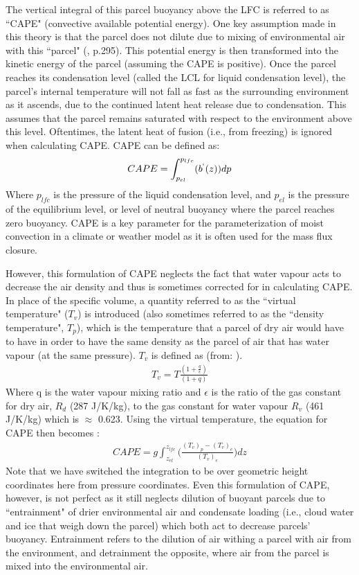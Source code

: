 \documentclass[letterpaper,12pt,titlepage,oneside,final]{book}
\begin{document}
The vertical integral of this parcel buoyancy above the LFC is referred to as ``CAPE" (convective available potential energy). One key assumption made in this theory is that the parcel does not dilute due to mixing of environmental air with this ``parcel" (\citep{holton_introduction_2004}, p.295). This potential energy is then transformed into the kinetic energy of the parcel (assuming the CAPE is positive). Once the parcel reaches its condensation level (called the LCL for liquid condensation level), the parcel's internal temperature will not fall as fast as the surrounding environment as it ascends, due to the continued latent heat release due to condensation. This assumes that the parcel remains saturated with respect to the environment above this level. Oftentimes, the latent heat of fusion (i.e., from freezing) is ignored when calculating CAPE. CAPE can be defined as: 
\begin{align}
CAPE=\int_{p_{el}}^{p_{lfc}}(b^{`}(z)){dp}
\end{align}
Where $p_{lfc}$ is the pressure of the liquid condensation level, and $p_{el}$ is the pressure of the equilibrium level, or level of neutral buoyancy where the parcel reaches zero buoyancy. CAPE is a key parameter for the parameterization of moist convection in a climate or weather model as it is often used for the mass flux closure. 

However, this formulation of CAPE neglects the fact that water vapour acts to decrease the air density and thus is sometimes corrected for in calculating CAPE. In place of the specific volume, a quantity referred to as the ``virtual temperature" ($T_{v}$) is introduced (also sometimes referred to as the ``density temperature", $T_{p}$), which is the temperature that a parcel of dry air would have to have in order to have the same density as the parcel of air that has water vapour (at the same pressure). $T_{v}$ is defined as (from: \citep{AMS_virtual_2012}).
\begin{align}
T_{v}=T\frac{(1+\frac{q}{\epsilon})}{(1+q)}
\end{align}
Where q is the water vapour mixing ratio and $\epsilon$ is the ratio of the gas constant for dry air, $R_{d}$ (287 J/K/kg), to the gas constant for water vapour $R_{v}$ (461 J/K/kg) which is $\approx$ 0.623. Using the virtual temperature, the equation for CAPE then becomes \citep{doswell_effect_1994}:
\begin{align}\label{eq:CAPE}
CAPE=g\int_{z_{el}}^{z_{lfc}}\Big(\frac{(T_{v})_{p}-(T_{v})_{e}}{(T_{v})_{e}}\Big){dz}
\end{align}
Note that we have switched the integration to be over geometric height coordinates here from pressure coordinates. Even this formulation of CAPE, however, is not perfect as it still neglects dilution of buoyant parcels due to ``entrainment" of drier environmental air and condensate loading (i.e., cloud water and ice that weigh down the parcel) which both act to decrease parcels' buoyancy. Entrainment refers to the dilution of air withing a parcel with air from the environment, and detrainment the opposite, where air from the parcel is mixed into the environmental air.
\end{document}
